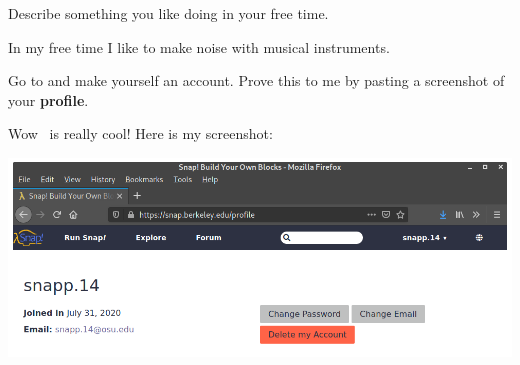 \documentclass[nooutcomes,noauthor]{ximera}
\begin{document}
\begin{question}
\begin{freeResponse}
\begin{center}
    \end{center}
  \end{freeResponse}
\end{question}
\mynewpage

\begin{question}
  Describe something you like doing in your free time.
  \begin{freeResponse}
    In my free time I like to make noise with musical instruments.
  \end{freeResponse}
\end{question}
\mynewpage

\begin{question}
  Go to \flavor and make yourself an account. Prove this to me by
  pasting a screenshot of your \textbf{profile}.
  \begin{freeResponse}
    Wow \snap\ is really cool! Here is my screenshot:
    \begin{center}
      \includegraphics[width=.4\textwidth]{profile.png}
    \end{center}
  \end{freeResponse}
\end{question}
\end{document}
